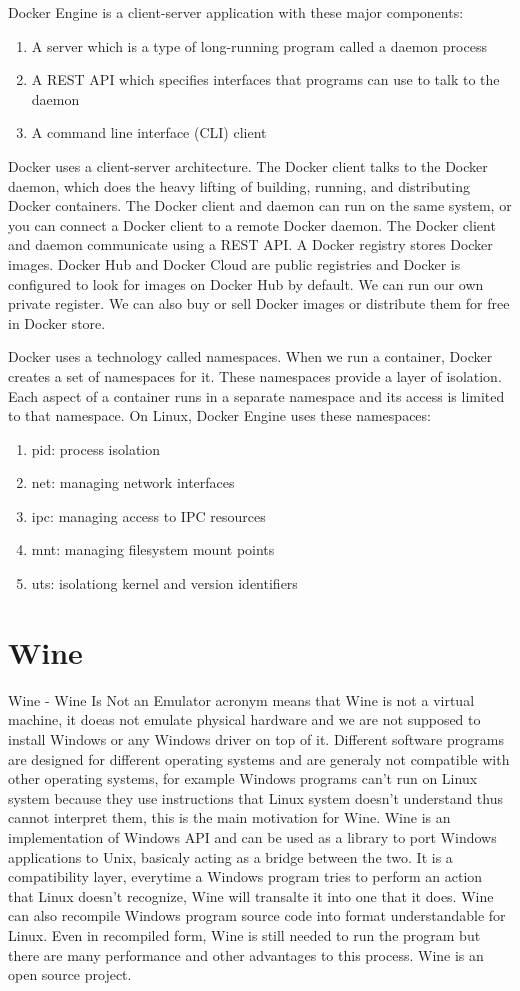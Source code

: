 Docker Engine is a client-server application with these major components:
\begin{enumerate}
\item A server which is a type of long-running program called a daemon process
\item A REST API which specifies interfaces that programs can use to talk to the daemon
\item A command line interface (CLI) client
\end{enumerate}
Docker uses a client-server architecture. The Docker client talks to the Docker daemon, which does the heavy lifting of building, running, and distributing Docker containers. The Docker client and daemon can run on the same system, or you can connect a Docker client to a remote Docker daemon. The Docker client and daemon communicate using a REST API.
A Docker registry stores Docker images. Docker Hub and Docker Cloud are public registries and Docker is configured to look for images on Docker Hub by default. We can run our own private register. We can also buy or sell Docker images or distribute them for free in Docker store.

Docker uses a technology called namespaces. When we run a container, Docker creates a set of namespaces for it. These namespaces provide a layer of isolation. Each aspect of a container runs in a separate namespace and its access is limited to that namespace.
On Linux, Docker Engine uses these namespaces:
\begin{enumerate}
\item pid: process isolation
\item net: managing network interfaces
\item ipc: managing access to IPC resources
\item mnt: managing filesystem mount points
\item uts: isolationg kernel and version identifiers
\end{enumerate}


\section{Wine}
Wine - Wine Is Not an Emulator acronym means that Wine is not a virtual machine, it doeas not emulate physical hardware and we are not supposed to install Windows or any Windows driver on top of it. Different software programs are designed for different operating systems and are generaly not compatible with other operating systems, for example Windows programs can't run on Linux system because they use instructions that Linux system doesn't understand thus cannot interpret them, this is the main motivation for Wine. Wine is an implementation of Windows API and can be used as a library to port Windows applications to Unix, basicaly acting as a bridge between the two. It is a compatibility layer, everytime a Windows program tries to perform an action that Linux doesn't recognize, Wine will transalte it into one that it does. Wine can also recompile Windows program source code into format understandable for Linux. Even in recompiled form, Wine is still needed to run the program but there are many performance and other advantages to this process. Wine is an open source project.

